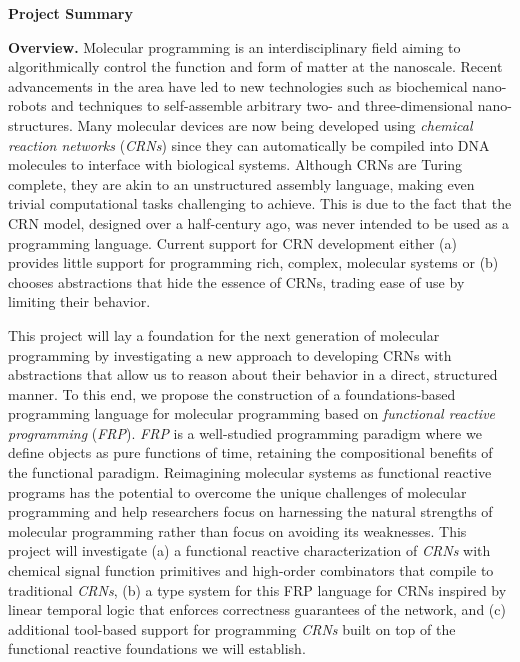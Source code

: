 \documentclass[11pt]{article}
\begin{document}
    \setcounter{page}{1}
    \begin{center}
        {\Large {\bf Project Summary}}
    \end{center}
    \vspace*{1em}

    \textbf{Overview.}
    Molecular programming is an interdisciplinary field aiming to algorithmically control the function and form of matter at the nanoscale.
    Recent advancements in the area have led to new technologies such as biochemical nano-robots and techniques to self-assemble arbitrary two- and three-dimensional nano-structures.
    Many molecular devices are now being developed using \emph{chemical reaction networks} (\emph{CRNs}) since they can automatically be compiled into DNA molecules to interface with biological systems.
    Although CRNs are Turing complete, they are akin to an unstructured assembly language, making even trivial computational tasks challenging to achieve.
    This is due to the fact that the CRN model, designed over a half-century ago, was never intended to be used as a programming language.
    Current support for CRN development either (a) provides little support for programming rich, complex, molecular systems or (b) chooses abstractions that hide the essence of CRNs, trading ease of use by limiting their behavior.

    This project will lay a foundation for the next generation of molecular programming by investigating a new approach to developing CRNs with abstractions that allow us to reason about their behavior in a direct, structured manner.
    To this end, we propose the construction of a foundations-based programming language for molecular programming based on \emph{functional reactive programming} (\emph{FRP}).
    \emph{FRP} is a well-studied programming paradigm where we define objects as pure functions of time, retaining the compositional benefits of the functional paradigm. 
    Reimagining molecular systems as functional reactive programs has the potential to overcome the unique challenges of molecular programming and help researchers focus on harnessing the natural strengths of molecular programming rather than focus on avoiding its weaknesses.
    This project will investigate (a) a functional reactive characterization of \emph{CRNs} with chemical signal function primitives and high-order combinators that compile to traditional \emph{CRNs}, (b) a type system for this FRP language for CRNs inspired by linear temporal logic that enforces correctness guarantees of the network, and (c) additional tool-based support for programming \emph{CRNs} built on top of the functional reactive foundations we will establish.
\end{document}
